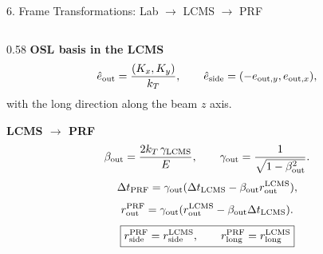 \documentclass{beamer}
\begin{document}
\begin{frame}{6. Frame Transformations: Lab $\rightarrow$ LCMS $\rightarrow$ PRF}
\begin{columns}[T]
\begin{column}{0.58\textwidth}
\smallskip
\textbf{OSL basis in the LCMS}
\vspace{-0.35em}
\[
\hat e_{\rm out}=\frac{(K_x,K_y)}{k_T},
\qquad
\hat e_{\rm side}=(-e_{{\rm out},y},e_{{\rm out},x}),
\]
\vspace{-0.45em}
with the long direction along the beam $z$ axis.

\smallskip
\textbf{LCMS $\rightarrow$ PRF}
\vspace{-0.35em}
\[
\beta_{\rm out}=\frac{2k_T\,\gamma_{\rm LCMS}}{E},
\qquad
\gamma_{\rm out}=\frac{1}{\sqrt{1-\beta_{\rm out}^2}}.
\]
\vspace{-0.6em}
\[
\Delta t_{\rm PRF}=\gamma_{\rm out}
(\Delta t_{\rm LCMS}-\beta_{\rm out}r_{\rm out}^{\rm LCMS}),
\]
\vspace{-0.65em}
\[
r_{\rm out}^{\rm PRF}=\gamma_{\rm out}
(r_{\rm out}^{\rm LCMS}-\beta_{\rm out}\Delta t_{\rm LCMS}).
\]
\vspace{-0.35em}
\[
\boxed{r_{\rm side}^{\rm PRF}=r_{\rm side}^{\rm LCMS},\qquad
r_{\rm long}^{\rm PRF}=r_{\rm long}^{\rm LCMS}}
\]
\end{column}

\end{columns}
\end{frame}
\end{document}
